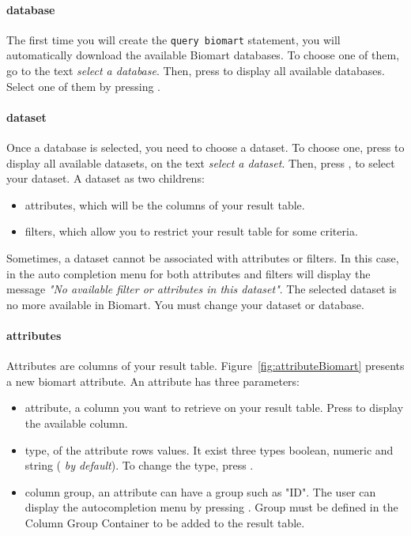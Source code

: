 \paragraph{database}
The first time you will create the \texttt{query biomart} statement, you will automatically download the available Biomart databases. To choose one of them, go to the text \textit{select a database}. Then, press \keys{\ctrl+\space} to display all available databases. Select one of them by pressing \keys{\return}. 


 \paragraph{dataset} 
Once a database is selected, you need to choose a dataset. To choose one, press \keys{\ctrl+\space} to display all available datasets, on the text \textit{select a dataset}. Then, press \keys{\return}, to select your dataset. \newline
A dataset as two childrens:
\begin{itemize}
\item attributes, which will be the columns of your result table.
\item filters, which allow you to restrict your result table for some criteria.
\end{itemize}
\begin{remark}
Sometimes, a dataset cannot be associated with attributes or filters. In this case, in the auto completion menu for both attributes and filters will display the message \textit{"No available filter or attributes in this dataset"}. The selected dataset is no more available in Biomart. You must change your dataset or database. 
\end{remark}

\paragraph{attributes}
Attributes are columns of your result table. Figure~\ref{fig:attributeBiomart} presents a new biomart attribute. An attribute has three parameters:
\begin{itemize}
\item attribute, a column you want to retrieve on your result table. Press \keys{\ctrl+\space} to display the available column.
\item type, of  the attribute rows values. It exist three  types
boolean, numeric and string (\textit{ by default}). To change the type, press \keys{\ctrl+\space}.
\item column group, an attribute can have a group such as "ID". The user can display the autocompletion menu by pressing \keys{\ctrl+\space}. Group must be defined in the Column Group Container to be added to the result table.
\end{itemize}

